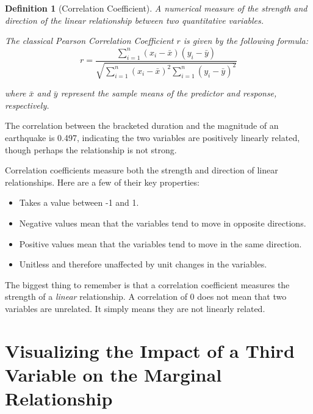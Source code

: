 \documentclass[
]{book}
\providecommand{\tightlist}{%
  \setlength{\itemsep}{0pt}\setlength{\parskip}{0pt}}
\theoremstyle{plain}
\theoremstyle{mydefn}
\newtheorem{definition}{Definition}[chapter]
\theoremstyle{myexmpl}
\theoremstyle{remark}
\begin{document}
\begin{definition}[Correlation Coefficient]
\protect\hypertarget{def:defn-correlation-coefficient}{}{\label{def:defn-correlation-coefficient} {} }A numerical measure of the \emph{strength} and \emph{direction} of the \emph{linear} relationship between two quantitative variables.

The classical Pearson Correlation Coefficient \(r\) is given by the following formula:
\[r = \frac{\sum_{i=1}^{n} \left(x_i - \bar{x}\right)\left(y_i - \bar{y}\right)}{\sqrt{\sum_{i=1}^n \left(x_i - \bar{x}\right)^2 \sum_{i=1}^n \left(y_i - \bar{y}\right)^2}}\]

where \(\bar{x}\) and \(\bar{y}\) represent the sample means of the predictor and response, respectively.
\end{definition}

The correlation between the bracketed duration and the magnitude of an earthquake is 0.497, indicating the two variables are positively linearly related, though perhaps the relationship is not strong.

\begin{rmdtip}
Correlation coefficients measure both the strength and direction of linear relationships. Here are a few of their key properties:

\begin{itemize}
\tightlist
\item
  Takes a value between -1 and 1.
\item
  Negative values mean that the variables tend to move in opposite directions.
\item
  Positive values mean that the variables tend to move in the same direction.
\item
  Unitless and therefore unaffected by unit changes in the variables.
\end{itemize}

The biggest thing to remember is that a correlation coefficient measures the strength of a \emph{linear} relationship. A correlation of 0 does not mean that two variables are unrelated. It simply means they are not linearly related.
\end{rmdtip}

\hypertarget{visualizing-the-impact-of-a-third-variable-on-the-marginal-relationship}{%
\section{Visualizing the Impact of a Third Variable on the Marginal Relationship}\label{visualizing-the-impact-of-a-third-variable-on-the-marginal-relationship}}
\end{document}
